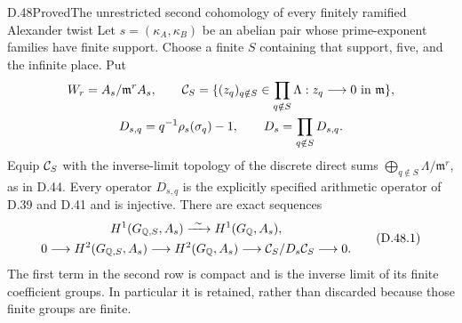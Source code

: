 \begin{statement}{D.48}{Proved}{The unrestricted second cohomology of every finitely ramified Alexander twist}
Let \(s=(\kappa_A,\kappa_B)\) be an abelian pair
whose prime-exponent families have finite support.
Choose a finite \(S\) containing that support,
five, and the infinite place. Put
\[
 \begin{gathered}
 W_r=A_s/\mathfrak m^r A_s,\qquad
 {\cal C}_S=
   \{(z_q)_{q\notin S}\in\prod_{q\notin S}\Lambda:
                  z_q\longrightarrow0\text{ in }\mathfrak m\},\\
 D_{s,q}=q^{-1}\rho_s(\sigma_q)-1,\qquad
 D_s=\prod_{q\notin S}D_{s,q}.
 \end{gathered}
\]
Equip \({\cal C}_S\) with the inverse-limit
topology of the discrete direct sums
\(\bigoplus_{q\notin S}\Lambda/\mathfrak m^r\),
as in D.44. Every operator \(D_{s,q}\)
is the explicitly specified arithmetic
operator of D.39 and D.41 and is injective.
There are exact sequences
\[
 \begin{gathered}
 H^1(G_{\mathbb Q,S},A_s)
                  \xrightarrow{\ \sim\ }
                    H^1(G_{\mathbb Q},A_s),\\
 0\longrightarrow H^2(G_{\mathbb Q,S},A_s)
  \longrightarrow H^2(G_{\mathbb Q},A_s)
  \longrightarrow {\cal C}_S/D_s{\cal C}_S
  \longrightarrow0.
 \end{gathered}                                                 \tag{D.48.1}
\]
The first term in the second row is compact
and is the inverse limit of its finite
coefficient groups. In particular it is
retained, rather than discarded because
those finite groups are finite.


\end{statement}
